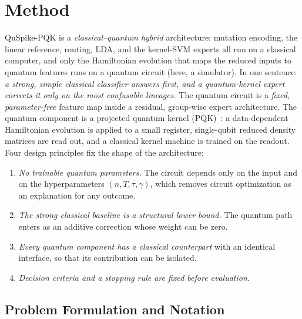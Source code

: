 \documentclass[conference]{IEEEtran}
\begin{document}
\section{Method}
\label{sec:method}

QuSpike-PQK is a \emph{classical--quantum hybrid} architecture: mutation encoding, the linear reference, routing, LDA, and the kernel-SVM experts all run on a classical computer, and only the Hamiltonian evolution that maps the reduced inputs to quantum features runs on a quantum circuit (here, a simulator). In one sentence: \emph{a strong, simple classical classifier answers first, and a quantum-kernel expert corrects it only on the most confusable lineages.} The quantum circuit is a \emph{fixed, parameter-free} feature map inside a residual, group-wise expert architecture. The quantum component is a projected quantum kernel (PQK)~\cite{huang2021power}: a data-dependent Hamiltonian evolution is applied to a small register, single-qubit reduced density matrices are read out, and a classical kernel machine is trained on the readout. Four design principles fix the shape of the architecture:
\begin{enumerate}
    \item[P1)] \textit{No trainable quantum parameters.} The circuit depends only on the input and on the hyperparameters $(n,T,\tau,\gamma)$, which removes circuit optimization as an explanation for any outcome.
    \item[P2)] \textit{The strong classical baseline is a structural lower bound.} The quantum path enters as an additive correction whose weight can be zero.
    \item[P3)] \textit{Every quantum component has a classical counterpart} with an identical interface, so that its contribution can be isolated.
    \item[P4)] \textit{Decision criteria and a stopping rule are fixed before evaluation.}
\end{enumerate}

\subsection{Problem Formulation and Notation}
\label{sec:formulation}
\end{document}
